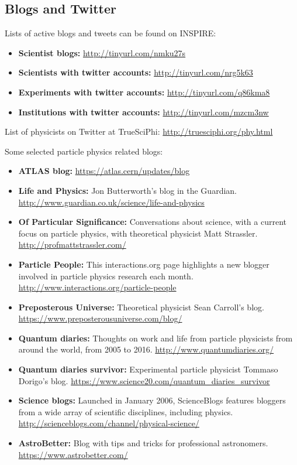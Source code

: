 \subsection{Blogs and Twitter}\label{databases:subsec:blogs}

Lists of active blogs and tweets can be found on INSPIRE:

\begin{itemize}
\item
  \textbf{Scientist blogs:} \url{http://tinyurl.com/nmku27s}
\item
  \textbf{Scientists with twitter accounts:}
  \url{http://tinyurl.com/nrg5k63}
\item
  \textbf{Experiments with twitter accounts:}
  \url{http://tinyurl.com/q86kma8}
\item
  \textbf{Institutions with twitter accounts:}
  \url{http://tinyurl.com/mzcm3nw}
\end{itemize}

List of physicists on Twitter at TrueSciPhi:
\url{http://truesciphi.org/phy.html}

Some selected particle physics related blogs:

\begin{itemize}
\item
  \textbf{ATLAS blog:} \url{https://atlas.cern/updates/blog}
\item
  \textbf{Life and Physics:} Jon Butterworth's blog in the Guardian.
  \url{http://www.guardian.co.uk/science/life-and-physics}
\item
  \textbf{Of Particular Significance:} Conversations about science, with
  a current focus on particle physics, with theoretical physicist Matt
  Strassler. \url{http://profmattstrassler.com/}
\item
  \textbf{Particle People:} This interactions.org page highlights a new
  blogger involved in particle physics research each month.
  \url{http://www.interactions.org/particle-people}
\item
  \textbf{Preposterous Universe:} Theoretical physicist Sean Carroll's
  blog. \url{https://www.preposterousuniverse.com/blog/}
\item
  \textbf{Quantum diaries:} Thoughts on work and life from particle
  physicists from around the world, from 2005 to 2016.
  \url{http://www.quantumdiaries.org/}
\item
  \textbf{Quantum diaries survivor:} Experimental particle physicist
  Tommaso Dorigo's blog.
  \url{https://www.science20.com/quantum_diaries_survivor}
\item
  \textbf{Science blogs:} Launched in January 2006, ScienceBlogs
  features bloggers from a wide array of scientific disciplines,
  including physics.
  \url{http://scienceblogs.com/channel/physical-science/}
\item
  \textbf{AstroBetter:} Blog with tips and tricks for professional
  astronomers. \url{https://www.astrobetter.com/}
\end{itemize}
